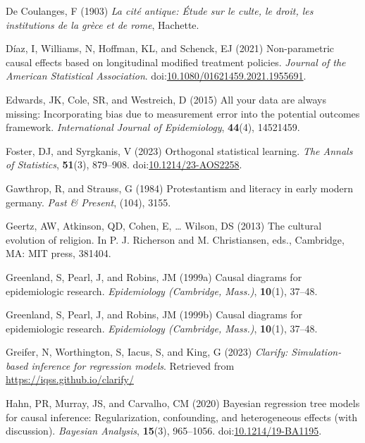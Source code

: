 \documentclass[
  singlecolumn,
  9pt]{article}
\begin{document}
\begin{CSLReferences}
De Coulanges, F (1903) \emph{La cité antique: Étude sur le culte, le
droit, les institutions de la grèce et de rome}, Hachette.

Díaz, I, Williams, N, Hoffman, KL, and Schenck, EJ (2021) Non-parametric
causal effects based on longitudinal modified treatment policies.
\emph{Journal of the American Statistical Association}.
doi:\href{https://doi.org/10.1080/01621459.2021.1955691}{10.1080/01621459.2021.1955691}.

Edwards, JK, Cole, SR, and Westreich, D (2015) All your data are always
missing: Incorporating bias due to measurement error into the potential
outcomes framework. \emph{International Journal of Epidemiology},
\textbf{44}(4), 14521459.

Foster, DJ, and Syrgkanis, V (2023) Orthogonal statistical learning.
\emph{The Annals of Statistics}, \textbf{51}(3), 879--908.
doi:\href{https://doi.org/10.1214/23-AOS2258}{10.1214/23-AOS2258}.

Gawthrop, R, and Strauss, G (1984) Protestantism and literacy in early
modern germany. \emph{Past \& Present}, (104), 3155.

Geertz, AW, Atkinson, QD, Cohen, E, \ldots{} Wilson, DS (2013) The
cultural evolution of religion. In P. J. Richerson and M. Christiansen,
eds., Cambridge, MA: MIT press, 381404.

Greenland, S, Pearl, J, and Robins, JM (1999a) Causal diagrams for
epidemiologic research. \emph{Epidemiology (Cambridge, Mass.)},
\textbf{10}(1), 37--48.

Greenland, S, Pearl, J, and Robins, JM (1999b) Causal diagrams for
epidemiologic research. \emph{Epidemiology (Cambridge, Mass.)},
\textbf{10}(1), 37--48.

Greifer, N, Worthington, S, Iacus, S, and King, G (2023) \emph{Clarify:
Simulation-based inference for regression models}. Retrieved from
\url{https://iqss.github.io/clarify/}

Hahn, PR, Murray, JS, and Carvalho, CM (2020) Bayesian regression tree
models for causal inference: Regularization, confounding, and
heterogeneous effects (with discussion). \emph{Bayesian Analysis},
\textbf{15}(3), 965--1056.
doi:\href{https://doi.org/10.1214/19-BA1195}{10.1214/19-BA1195}.


\end{CSLReferences}
\end{document}
